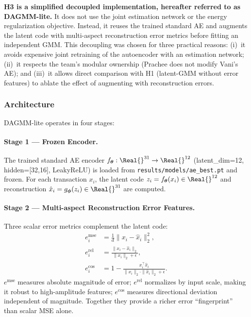 \textbf{H3 is a simplified decoupled implementation, hereafter referred to as DAGMM-lite.} It does not use the joint estimation network or the energy regularization objective. Instead, it reuses the trained standard AE and augments the latent code with multi-aspect reconstruction error metrics before fitting an independent GMM. This decoupling was chosen for three practical reasons: (i)~it avoids expensive joint retraining of the autoencoder with an estimation network; (ii)~it respects the team's modular ownership (Prachee does not modify Vani's AE); and (iii)~it allows direct comparison with H1 (latent-GMM without error features) to ablate the effect of augmenting with reconstruction errors.

\subsubsection{Architecture}
DAGMM-lite operates in four stages:

\paragraph{Stage 1 --- Frozen Encoder.}
The trained standard AE encoder $f_{\boldsymbol{\theta}}: \Real{}^{31} \to \Real{}^{12}$ (latent\_dim=12, hidden=[32,16], LeakyReLU) is loaded from \texttt{results/models/ae\_best.pt} and frozen. For each transaction $x_i$, the latent code $z_i = f_{\boldsymbol{\theta}}(x_i) \in \Real{}^{12}$ and reconstruction $\hat{x}_i = g_{\boldsymbol{\phi}}(z_i) \in \Real{}^{31}$ are computed.

\paragraph{Stage 2 --- Multi-aspect Reconstruction Error Features.}
Three scalar error metrics complement the latent code:
\begin{align}
    e^{\text{mse}}_i &= \frac{1}{d}\|x_i - \hat{x}_i\|_2^2, \label{eq:emse} \\
    e^{\text{rel}}_i &= \frac{\|x_i - \hat{x}_i\|_2}{\|x_i\|_2 + \epsilon}, \label{eq:erel} \\
    e^{\text{cos}}_i &= 1 - \frac{x_i^\top \hat{x}_i}{\|x_i\|_2 \cdot \|\hat{x}_i\|_2 + \epsilon}. \label{eq:ecos}
\end{align}
$e^{\text{mse}}$ measures absolute magnitude of error; $e^{\text{rel}}$ normalizes by input scale, making it robust to high-amplitude features; $e^{\text{cos}}$ measures directional deviation independent of magnitude. Together they provide a richer error ``fingerprint'' than scalar MSE alone.

